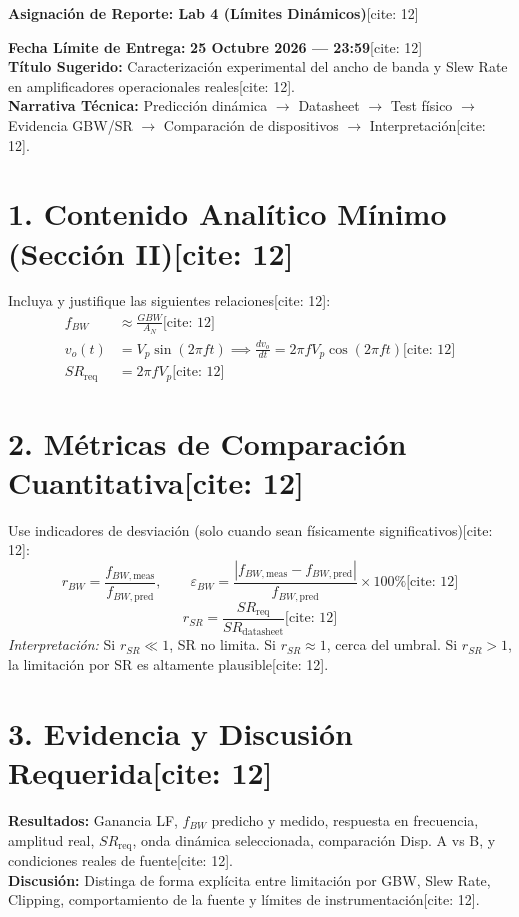 \documentclass[11pt, a4paper]{article}
\begin{document}
\begin{center}
    \Large\textbf{\textcolor{ucbblue}{Asignación de Reporte: Lab 4 (Límites Dinámicos)}}[cite: 12]
\end{center}

\textbf{Fecha Límite de Entrega:} \textbf{25 Octubre 2026 — 23:59}[cite: 12] \\
\textbf{Título Sugerido:} Caracterización experimental del ancho de banda y Slew Rate en amplificadores operacionales reales[cite: 12]. \\
\textbf{Narrativa Técnica:} Predicción dinámica $\rightarrow$ Datasheet $\rightarrow$ Test físico $\rightarrow$ Evidencia GBW/SR $\rightarrow$ Comparación de dispositivos $\rightarrow$ Interpretación[cite: 12].

\section*{1. Contenido Analítico Mínimo (Sección II)[cite: 12]}
Incluya y justifique las siguientes relaciones[cite: 12]:
\begin{align}
    f_{BW} &\approx \frac{GBW}{A_N} \text{[cite: 12]} \\
    v_o(t) &= V_p\sin(2\pi f t) \implies \frac{dv_o}{dt} = 2\pi f V_p \cos(2\pi f t) \text{[cite: 12]} \\
    SR_{\mathrm{req}} &= 2\pi f V_p \text{[cite: 12]}
\end{align}

\section*{2. Métricas de Comparación Cuantitativa[cite: 12]}
Use indicadores de desviación (solo cuando sean físicamente significativos)[cite: 12]:
\begin{equation}
    r_{BW} = \frac{f_{BW,\mathrm{meas}}}{f_{BW,\mathrm{pred}}}, \qquad \varepsilon_{BW} = \frac{|f_{BW,\mathrm{meas}} - f_{BW,\mathrm{pred}}|}{f_{BW,\mathrm{pred}}} \times 100\% \text{[cite: 12]}
\end{equation}
\begin{equation}
    r_{SR} = \frac{SR_{\mathrm{req}}}{SR_{\mathrm{datasheet}}} \text{[cite: 12]}
\end{equation}
\textit{Interpretación:} Si $r_{SR} \ll 1$, SR no limita. Si $r_{SR} \approx 1$, cerca del umbral. Si $r_{SR} > 1$, la limitación por SR es altamente plausible[cite: 12].

\section*{3. Evidencia y Discusión Requerida[cite: 12]}
\textbf{Resultados:} Ganancia LF, $f_{BW}$ predicho y medido, respuesta en frecuencia, amplitud real, $SR_{\mathrm{req}}$, onda dinámica seleccionada, comparación Disp. A vs B, y condiciones reales de fuente[cite: 12]. \\
\textbf{Discusión:} Distinga de forma explícita entre limitación por GBW, Slew Rate, Clipping, comportamiento de la fuente y límites de instrumentación[cite: 12].
\end{document}
